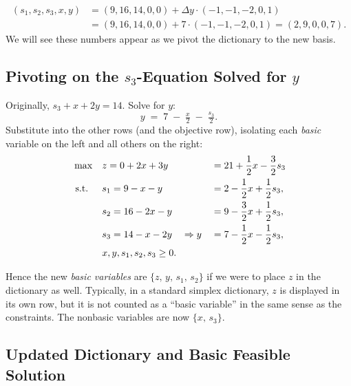 \begin{align*}
 (s_1, s_2, s_3, x,y) &= (9,16,14,0,0) + \Delta y \cdot (-1, -1, -2, 0,1)\\
 &= (9,16,14,0,0) + 7\cdot (-1, -1, -2, 0,1)  = (2,9,0,0,7).
\end{align*}
We will see these numbers appear as we pivot the dictionary to the new basis.

\subsection*{Pivoting on the \(s_3\)-Equation Solved for \(y\)}

Originally, \(s_3 + x + 2y = 14\).  Solve for \(y\):
\[
y \;=\; 7 \;-\; \tfrac{x}{2} \;-\; \tfrac{s_3}{2}.
\]
Substitute into the other rows (and the objective row), isolating each \emph{basic} variable on the left and all others on the right:
\[
\begin{aligned}
\max\quad 
& z = 0+ 2x + 3y \quad && = 21 + \frac{1}{2}x - \frac{3}{2}s_3 \\
\mbox{ s.t. }\quad 
& s_1 = 9 - x - y \quad && = 2 - \frac{1}{2}x + \frac{1}{2}s_3, \\
& s_2 = 16 - 2x - y \quad &&= 9 - \frac{3}{2}x + \frac{1}{2}s_3, \\
& s_3 = 14 - x - 2y \quad \Rightarrow y &&= 7 - \frac{1}{2}x - \frac{1}{2}s_3, \\
& x, y, s_1, s_2, s_3 \ge 0.
\end{aligned}
\]

\noindent
Hence the new \emph{basic variables} are \(\{z,\,y,\,s_1,\,s_2\}\) if we were to place \(z\) in the dictionary as well.  Typically, in a standard simplex dictionary, \(z\) is displayed in its own row, but it is not counted as a “basic variable” in the same sense as the constraints.  The nonbasic variables are now \(\{x,\,s_3\}\).

\subsection*{Updated Dictionary and Basic Feasible Solution}

